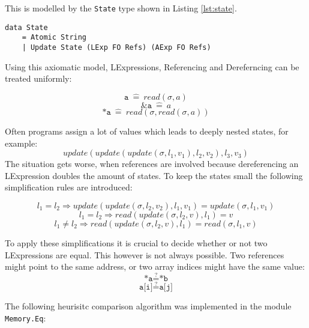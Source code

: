 \documentclass[12pt]{article}
\begin{document}
This is modelled by the \texttt{State} type shown in Listing \ref{lst:state}.

\begin{lstlisting}[style=c0, caption=State, label=lst:state]
data State
    = Atomic String
    | Update State (LExp FO Refs) (AExp FO Refs)
\end{lstlisting}

Using this axiomatic model, LExpressions, Referencing and Dereferncing can be treated uniformly:

\[ \texttt{a}\ \hat{=}\ read(\sigma, a) \]
\[ \texttt{\&a}\ \hat{=}\ a \]
\[ \texttt{*a}\ \hat{=}\ read(\sigma, read(\sigma, a))\]

Often programs assign a lot of values which leads to deeply nested states, for example:
\[ update(update(update(\sigma, l_1, v_1), l_2, v_2), l_3, v_3) \]
The situation gets worse, when references are involved because dereferencing an LExpression doubles the amount of states. 
To keep the states small the following simplification rules are introduced:

\[ l_1 = l_2 \Rightarrow update(update(\sigma, l_2 , v_2), l_1, v_1) = update(\sigma, l_1 , v_1)\]
\[ l_1 = l_2 \Rightarrow read(update(\sigma, l_2 , v), l_1) = v \]
\[ l_1 \neq l_2 \Rightarrow read(update(\sigma, l_2 , v), l_1) = read(\sigma, l_1 , v) \]

To apply these simplifications it is crucial to decide whether or not two LExpressions are equal.
This however is not always possible.
Two references might point to the same address, or two array indices might have the same value:
\[ \texttt{*a} \stackrel{?}{=} \texttt{*b} \]
\[ \texttt{a[i]} \stackrel{?}{=} \texttt{a[j]} \]

The following heurisitc comparison algorithm was implemented in the module \texttt{Memory.Eq}:
\end{document}
